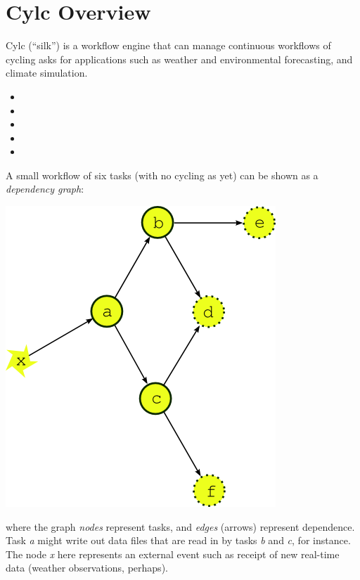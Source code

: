 \section{Cylc Overview}
\label{Cylc Overview}


Cylc (``silk'') is a workflow engine that can manage continuous workflows of
cycling asks for applications such as weather and environmental
forecasting, and climate simulation.

\begin{itemize}
    \item {}
    \item {}
    \item {}
    \item {}
    \item {} 
\end{itemize}

A small workflow of six tasks (with no cycling as yet) can be shown as a {\em
dependency graph}:

\begin{center}
    \includegraphics[width=0.25\columnwidth]{resources/tex/dep-one-cycle}
\end{center}

where the graph {\em nodes} represent tasks, and {\em edges} (arrows) represent
dependence.  Task {\em a} might write out data files that are read in by tasks
{\em b} and {\em c}, for instance.  The node {\em x} here represents an
external event such as receipt of new real-time data (weather observations,
perhaps).

